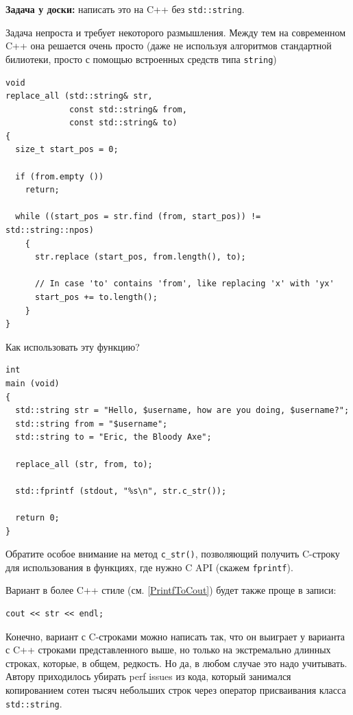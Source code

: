 \documentclass[a4paper,12pt,oneside]{article}
\begin{document}
\textbf{Задача у доски:} написать это на C++ без \lstinline!std::string!.

Задача непроста и требует некоторого размышления. Между тем на современном C++ она решается очень просто (даже не используя алгоритмов стандартной билиотеки, просто с помощью встроенных средств типа \lstinline!string!)

\begin{lstlisting}
void
replace_all (std::string& str,
             const std::string& from,
             const std::string& to)
{
  size_t start_pos = 0;

  if (from.empty ())
    return;

  while ((start_pos = str.find (from, start_pos)) != std::string::npos)
    {
      str.replace (start_pos, from.length(), to);

      // In case 'to' contains 'from', like replacing 'x' with 'yx'
      start_pos += to.length(); 
    }
}
\end{lstlisting}

Как использовать эту функцию?

\begin{lstlisting}
int
main (void)
{
  std::string str = "Hello, $username, how are you doing, $username?";
  std::string from = "$username";
  std::string to = "Eric, the Bloody Axe";

  replace_all (str, from, to);

  std::fprintf (stdout, "%s\n", str.c_str());

  return 0;
}
\end{lstlisting}

Обратите особое внимание на метод \lstinline!c_str()!, позволяющий получить C-строку для использования в функциях, где нужно C API (скажем \lstinline!fprintf!).

Вариант в более C++ стиле (см. \ref{PrintfToCout}) будет также проще в записи:

\begin{lstlisting}
cout << str << endl;
\end{lstlisting}

Конечно, вариант с C-строками можно написать так, что он выиграет у варианта с C++ строками представленного выше, но только на экстремально длинных строках, которые, в общем, редкость. Но да, в любом случае это надо учитывать. Автору приходилось убирать perf issues из кода, который занимался копированием сотен тысяч небольших строк через оператор присваивания класса \lstinline!std::string!.
\end{document}
